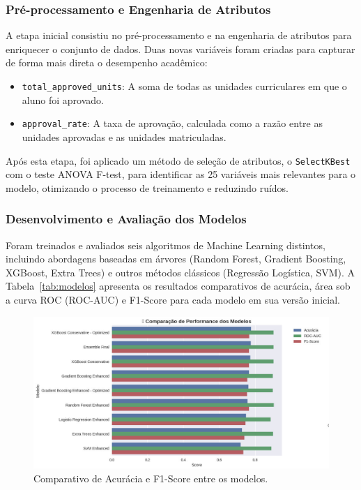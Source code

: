 \documentclass[12pt]{article}
\begin{document}
\subsubsection{Pré-processamento e Engenharia de Atributos}
A etapa inicial consistiu no pré-processamento e na engenharia de atributos para enriquecer o conjunto de dados. Duas novas variáveis foram criadas para capturar de forma mais direta o desempenho acadêmico:
\begin{itemize}
    \item \texttt{total\_approved\_units}: A soma de todas as unidades curriculares em que o aluno foi aprovado.
    \item \texttt{approval\_rate}: A taxa de aprovação, calculada como a razão entre as unidades aprovadas e as unidades matriculadas.
\end{itemize}
Após esta etapa, foi aplicado um método de seleção de atributos, o \texttt{SelectKBest} com o teste ANOVA F-test, para identificar as 25 variáveis mais relevantes para o modelo, otimizando o processo de treinamento e reduzindo ruídos.

\subsubsection{Desenvolvimento e Avaliação dos Modelos}
Foram treinados e avaliados seis algoritmos de Machine Learning distintos, incluindo abordagens baseadas em árvores (Random Forest, Gradient Boosting, XGBoost, Extra Trees) e outros métodos clássicos (Regressão Logística, SVM). A Tabela~\ref{tab:modelos} apresenta os resultados comparativos de acurácia, área sob a curva ROC (ROC-AUC) e F1-Score para cada modelo em sua versão inicial.

\begin{figure}[h!]
\centering
\includegraphics[width=1.0\textwidth]{images/comparacao_modelos.jpg}
\caption{Comparativo de Acurácia e F1-Score entre os modelos.}
\label{fig:comparacao_modelos}
\end{figure}
\end{document}
